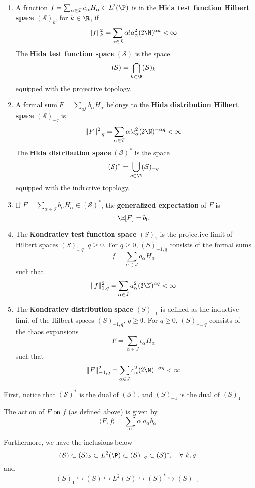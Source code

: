 \begin{definition}

	~\begin{enumerate}
	\item A function $f = \sum_{\alpha \in \mathcal{I}} a_\alpha H_\alpha \in L^2(\P)$ is in the \textbf{Hida test function Hilbert space} $(\mathcal{S})_k$, for $k \in \R$, if \[ \| f \|_k^2 = \sum_{\alpha \in \mathcal{I}} \alpha! a_\alpha^2 (2\N)^{\alpha k} < \infty \] 
		The \textbf{Hida test function space} $(\mathcal{S})$ is the space 
		\[
			(\mathcal{S}) = \bigcap_{k \in \R} (\mathcal{S})_k
		\]
		equipped with the projective topology.

	\item A formal sum $F = \sum_{a \mathcal{I}} b_\alpha H_\alpha$ belongs to the \textbf{Hida distribution Hilbert space} $(\mathcal{S})_{-q}$ is 
		\[
			\| F \|_{-q}^2 = \sum_{\alpha \in \mathcal{I}} \alpha! c_\alpha^2 (2\N)^{-\alpha q} < \infty 
		\]
		The \textbf{Hida distribution space} $(\mathcal{S})^\ast$ is the space
		\[
			(\mathcal{S})^\ast = \bigcup_{q \in \R} (\mathcal{S})_{-q}
		\]
		equipped with the inductive topology. 

	\item If $F = \sum_{\alpha \in \mathcal{I}} b_\alpha H_\alpha \in (\mathcal{S})^\ast$, the \textbf{generalized expectation} of $F$ is 
		\[
			\E[F] = b_0
		\]
		
	\item The \textbf{Kondratiev test function space} $(S)_1$ is the projective limit of Hilbert spaces $(S)_{1,q}$, $q \ge 0$. For $q \ge 0$, $(S)_{-1, q}$ consists of the formal sums
	\[
	f = \sum_{\alpha \in J} a_\alpha H_\alpha	
	\]
	such that
	\[
	\| f \|_{1, q}^2 = \sum_{\alpha \in J} a_\alpha^2 (2 \N)^{\alpha q} < \infty 
	\]

	\item The \textbf{Kondratiev distribution space} $(S)_{-1}$ is defined as the inductive limit of the Hilbert spaces $(S)_{-1, q}$, $q \ge 0$. For $q \ge 0$, $(S)_{-1, q}$ consists of the chaos expansions 
	\[
	F = \sum_{\alpha \in J} c_\alpha H_\alpha
	\]
	such that 
	\[
	\| F \|_{-1, q}^2 = \sum_{\alpha \in J} c_\alpha^2 (2 \N)^{-\alpha q} < \infty 
	\]
	\end{enumerate}
\end{definition}

\begin{remark}
First, notice that $(\mathcal{S})^\ast$ is the dual of $(\mathcal{S})$, and $(S)_{-1}$ is the dual of $(S)_1$.

The action of $F$ on $f$ (as defined above) is given by
\[
	\langle F, f \rangle = \sum_{\alpha} \alpha! a_\alpha b_\alpha
\]

Furthermore, we have the inclusions below
\[
	(\mathcal{S}) \subset (\mathcal{S})_k \subset L^2(\P) \subset (\mathcal{S})_{-q} \subset (\mathcal{S})^\ast, \quad \forall~k, q
\]
and 
\[
(S)_1 \hookrightarrow (S) \hookrightarrow L^2(S) \hookrightarrow (S)^* \hookrightarrow (S)_{-1}
\]
\end{remark}

